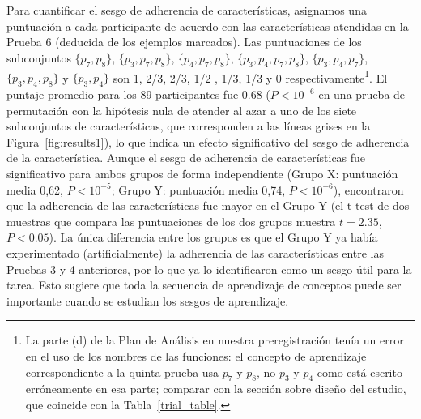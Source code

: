 Para cuantificar el sesgo de adherencia de características, asignamos una puntuación a cada participante de acuerdo con las características atendidas en la Prueba 6 (deducida de los ejemplos marcados). Las puntuaciones de los subconjuntos $ \{p_7, p_8 \} $, $ \{p_3, p_7, p_8 \} $, $ \{p_4, p_7, p_8 \} $, $ \{p_3, p_4, p_7, p_8 \} $, $ \{p_3, p_4, p_7 \} $, $ \{p_3, p_4, p_8 \} $ y $ \{p_3, p_4 \} $ son 1, 2/3, 2/3, 1/2 , 1/3, 1/3 y 0 respectivamente\footnote{La parte (d) de la Plan de Análisis en nuestra preregistración tenía un error en el uso de los nombres de las funciones: el concepto de aprendizaje correspondiente a la quinta prueba usa $ p_7 $ y $ p_8 $, no $ p_3 $ y $ p_4 $ como está escrito erróneamente en esa parte; comparar con la sección sobre diseño del estudio, que coincide con la Tabla~\ref{trial_table}.}. El puntaje promedio para los 89 participantes fue 0.68 ($ P <10^{- 6} $ en una prueba de permutación con la hipótesis nula de atender al azar a uno de los siete subconjuntos de características, que corresponden a las líneas grises en la Figura~\ref{fig:results1}), lo que indica un efecto significativo del sesgo de adherencia de la característica. Aunque el sesgo de adherencia de características fue significativo para ambos grupos de forma independiente (Grupo X: puntuación media 0,62, $ P <10^{-5} $; Grupo Y: puntuación media 0,74, $ P <10^{-6} $), encontraron que la adherencia de las características fue mayor en el Grupo Y (el t-test de dos muestras que compara las puntuaciones de los dos grupos muestra $ t = 2.35 $, $ P <0.05 $). La única diferencia entre los grupos es que el Grupo Y ya había experimentado (artificialmente) la adherencia de las características entre las Pruebas 3 y 4 anteriores, por lo que ya lo identificaron como un sesgo útil para la tarea. Esto sugiere que toda la secuencia de aprendizaje de conceptos puede ser importante cuando se estudian los sesgos de aprendizaje.

